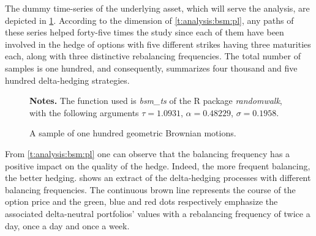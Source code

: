 \documentclass[a4paper, 12pt]{report}
\begin{document}
The dummy time-series of the underlying asset, which will serve the analysis, are depicted in \cref{p:analysis:gbm:100}. 
According to the dimension of \cref{t:analysis:bsm:pl}, any paths of these series helped forty-five times the study since each of them have been involved in the hedge of options with five different strikes having three maturities each, along with three distinctive rebalancing frequencies.
The total number of samples is one hundred, and consequently,  summarizes four thousand and five hundred delta-hedging strategies.

\begin{figure}[ht]
  \centering
  
  \caption{A sample of one hundred geometric Brownian motions.}
  \begin{changemargin}{0.5cm}{0.5cm}
  \medskip
\footnotesize
{}\textbf{Notes.} The function used is \textit{bsm\_ts} of the R package \textit{randomwalk}, with the following arguments $\tau = 1.0931$, $\alpha = 0.48229$, $\sigma = 0.1958$.
  \end{changemargin}
  \label{p:analysis:gbm:100}
\end{figure}



























From \cref{t:analysis:bsm:pl} one can observe that the balancing frequency has a positive impact on the quality of the hedge.
Indeed, the more frequent balancing, the better hedging.
 shows an extract of the delta-hedging processes with different balancing frequencies.
The continuous brown line represents the course of the option price and the green, blue and red dots respectively emphasize the associated delta-neutral portfolios' values with a rebalancing frequency of twice a day, once a day and once a week.
\end{document}
